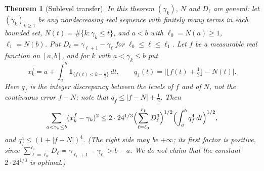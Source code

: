 \documentclass[11pt,a4paper]{article}
\numberwithin{equation}{section}
\newtheorem{theorem}{Theorem}[section]
\theoremstyle{definition}
\theoremstyle{remark}
\newcommand{\Ind}{\mathbf 1}
\begin{document}
\begin{theorem}[Sublevel transfer]\label{thm:transfer}
In this theorem $(\gamma_k)$, $N$ and $D_\ell$ are general: let $(\gamma_k)_{k\ge1}$ be any nondecreasing real sequence with finitely many terms in each bounded set, $N(t)=\#\{k:\gamma_k\le t\}$, and $a<b$ with $\ell_0=N(a)\ge1$, $\ell_1=N(b)$. Put $D_\ell=\gamma_{\ell+1}-\gamma_\ell$ for $\ell_0\le\ell\le\ell_1$. Let $f$ be a measurable real function on $[a,b]$, and for $k$ with $a<\gamma_k\le b$ put
\begin{equation}
x^f_k=a+\int_a^b\Ind_{\{f(t)<k-\frac12\}}\,dt,\qquad q_f(t)=\bigl|\lfloor f(t)+\tfrac12\rfloor-N(t)\bigr| .
\label{eq:disp_21}
\end{equation}
Here $q_f$ is the integer discrepancy between the levels of $f$ and of $N$, not the continuous error $f-N$; note that $q_f\le|f-N|+\frac12$. Then
\begin{equation}
\sum_{a<\gamma_k\le b}(x^f_k-\gamma_k)^2\le2\cdot24^{1/3}\Bigl(\sum_{\ell=\ell_0}^{\ell_1}D_\ell^3\Bigr)^{1/2}\Bigl(\int_a^bq_f^4\,dt\Bigr)^{1/2},
\label{eq:transfer}
\end{equation}
and $q_f^4\le(1+|f-N|)^4$. (The right side may be $+\infty$; its first factor is positive, since $\sum_{\ell=\ell_0}^{\ell_1}D_\ell=\gamma_{\ell_1+1}-\gamma_{\ell_0}>b-a$. We do not claim that the constant $2\cdot24^{1/3}$ is optimal.)
\end{theorem}
\end{document}
